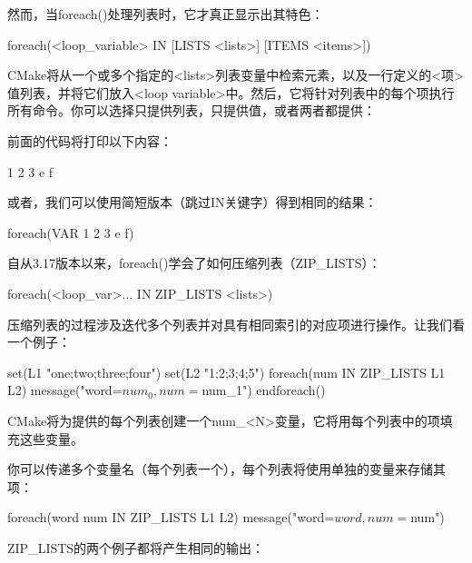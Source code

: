 然而，当foreach()处理列表时，它才真正显示出其特色：

\begin{shell}
foreach(<loop_variable> IN [LISTS <lists>] [ITEMS <items>])
\end{shell}

CMake将从一个或多个指定的<lists>列表变量中检索元素，以及一行定义的<项>值列表，并将它们放入<loop variable>中。然后，它将针对列表中的每个项执行所有命令。你可以选择只提供列表，只提供值，或者两者都提供：



前面的代码将打印以下内容：

\begin{shell}
1
2
3
e
f
\end{shell}

或者，我们可以使用简短版本（跳过IN关键字）得到相同的结果：

\begin{cmake}
foreach(VAR 1 2 3 e f)
\end{cmake}

自从3.17版本以来，foreach()学会了如何压缩列表（ZIP\_LISTS）：

\begin{shell}
foreach(<loop_var>... IN ZIP_LISTS <lists>)
\end{shell}

压缩列表的过程涉及迭代多个列表并对具有相同索引的对应项进行操作。让我们看一个例子：


\begin{cmake}
set(L1 "one;two;three;four")
set(L2 "1;2;3;4;5")
foreach(num IN ZIP_LISTS L1 L2)
    message("word=${num_0}, num=${num_1}")
endforeach()
\end{cmake}

CMake将为提供的每个列表创建一个num\_<N>变量，它将用每个列表中的项填充这些变量。

你可以传递多个变量名（每个列表一个），每个列表将使用单独的变量来存储其项：

\begin{cmake}
foreach(word num IN ZIP_LISTS L1 L2)
    message("word=${word}, num=${num}")
\end{cmake}

ZIP\_LISTS的两个例子都将产生相同的输出：


